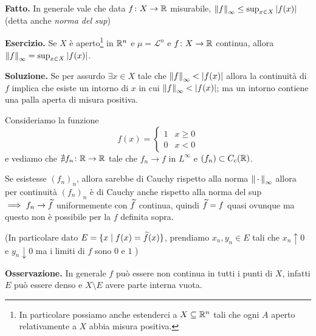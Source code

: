 \textbf{Fatto.} 
In generale vale che data $f \colon X \to \mathbb R$ misurabile, $\left\lVert f \right\rVert_\infty \leq \sup_{x \in X} |f(x)|$ (detta anche \textit{norma del sup})

\textbf{Esercizio.} 
Se $X$ è aperto\footnote{In particolare possiamo anche estenderci a $X \subseteq \mathbb R^n$ tali che ogni $A$ aperto relativamente a $X$ abbia misura positiva.} in $\mathbb R^n$ e $\mu = \mathscr L^n$ e $f \colon X \to \mathbb R$ continua, allora $\left\lVert f \right\rVert_\infty = \sup_{x \in X} |f(x)|$.

\textbf{Soluzione.}
Se per assurdo $\exists x \in X$ tale che $\left\lVert f \right\rVert_\infty < |f(x)|$ allora la continuità di $f$ implica che esiste un intorno di $x$ in cui $\left\lVert f \right\rVert_\infty < |f(x)|$; ma un intorno contiene una palla aperta di misura positiva. \absurd

\begin{wrapfigure}{r}{125pt}
	\centering
	\vspace{-2.5\baselineskip}
	\vspace{-3.5\baselineskip}
\end{wrapfigure}


Consideriamo la funzione
$$
f(x) =
\begin{cases}
	1 & x \geq 0 \\
	0 & x < 0
\end{cases}
$$
e vediamo che $\nexists f_n \colon \mathbb R \to \mathbb R$ tale che $f_n \to f$ in $L^\infty$ e $(f_n) \subset C_c(\mathbb R)$. 

Se esistesse $(f_n)_n$, allora sarebbe di Cauchy rispetto alla norma $\left\lVert \,\cdot\, \right\rVert_\infty$ allora per continuità $(f_n)_n$ è di Cauchy anche rispetto alla norma del sup $\implies f_n \to \widetilde f$ uniformemente con $\widetilde f$ continua, quindi $\widetilde f = f$ quasi ovunque ma questo non è possibile per la $f$ definita sopra.

(In particolare dato $E = \{ x \mid f(x) = \widetilde f(x) \}$, prendiamo $x_n, y_n \in E$ tali che $x_n \uparrow 0$ e $y_n \downarrow 0$ ma i limiti di $f$ sono $0$ e $1$ \absurd)

\vss


\textbf{Osservazione.} 
In generale $f$ può essere non continua in tutti i punti di $X$, infatti $E$ può essere denso e $X \setminus E$ avere parte interna vuota.

